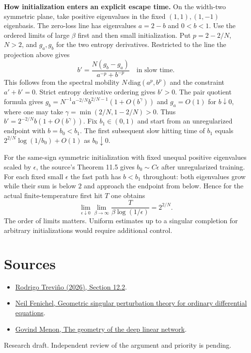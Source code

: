 \documentclass[10pt]{article}
\begin{document}
\textbf{How initialization enters an explicit escape time.} On the width-two symmetric plane, take positive eigenvalues in the fixed $(1,1),(1,-1)$ eigenbasis. The zero-loss line has eigenvalues $a=2-b$ and $0<b<1$. Use the ordered limits of large $\beta$ first and then small initialization. Put $p=2-2/N$, $N>2$, and $g_a,g_b$ for the two entropy derivatives. Restricted to the line the projection above gives
\[
 b'=\frac{N(g_b-g_a)}{a^{-p}+b^{-p}} \quad\text{in slow time}.
\]
This follows from the spectral mobility $N\,\mathrm{diag}(a^p,b^p)$ and the constraint $a'+b'=0$. Strict entropy derivative ordering gives $b'>0$. The pair quotient formula gives $g_b=N^{-1}a^{-2/N}b^{2/N-1}(1+O(b^\gamma))$ and $g_a=O(1)$ for $b\downarrow0$, where one may take $\gamma=\min(2/N,1-2/N)>0$. Thus $b'=2^{-2/N}b(1+O(b^\gamma))$. Fix $b_1\in(0,1)$ and start from an unregularized endpoint with $b=b_0<b_1$. The first subsequent slow hitting time of $b_1$ equals $2^{2/N}\log(1/b_0)+O(1)$ as $b_0\downarrow0$.

For the same-sign symmetric initialization with fixed unequal positive eigenvalues scaled by $\epsilon$, the source's Theorem 11.5 gives $b_0\sim C\epsilon$ after unregularized training. For each fixed small $\epsilon$ the fast path has $b<b_1$ throughout: both eigenvalues grow while their sum is below $2$ and approach the endpoint from below. Hence for the actual finite-temperature first hit $T$ one obtains
\[
 \lim_{\epsilon\downarrow0}\lim_{\beta\to\infty}
 \frac{T}{\beta\log(1/\epsilon)}=2^{2/N}.
\]
The order of limits matters. Uniform estimates up to a singular completion for arbitrary initializations would require additional control.

\section*{Sources}
\begin{itemize}
\item \href{https://arxiv.org/abs/2610.05551}{Rodrigo Treviño (2026), Section 12.2}.
\item \href{https://doi.org/10.1016/0022-0396(79)90152-9}{Neil Fenichel, Geometric singular perturbation theory for ordinary differential equations}.
\item \href{https://arxiv.org/abs/2411.09004}{Govind Menon, The geometry of the deep linear network}.
\end{itemize}
{\small Research draft. Independent review of the argument and priority is pending.}
\end{document}
